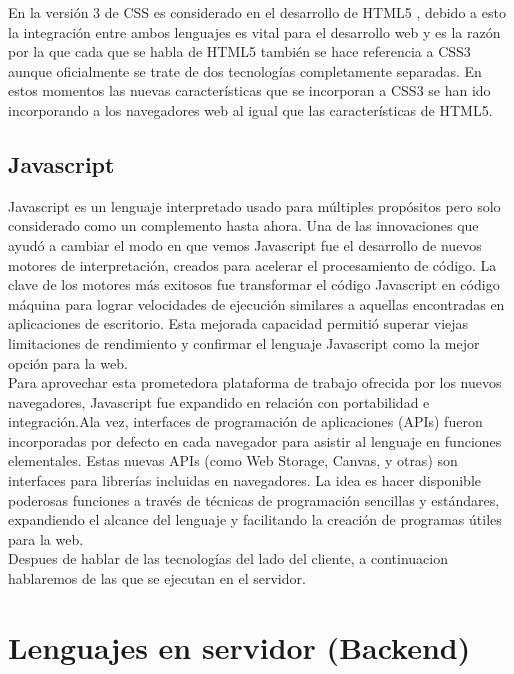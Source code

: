 En la versi\'on 3 de CSS es considerado en el desarrollo de HTML5 , debido a esto la integraci\'on entre ambos lenguajes es vital para el desarrollo web  y es la raz\'on por la que cada que se habla de HTML5 tambi\'en se hace referencia a CSS3 aunque oficialmente se trate de dos tecnolog\'ias completamente separadas.
En estos momentos las nuevas caracter\'isticas que se incorporan a CSS3 se han ido incorporando a los navegadores web al igual que las caracter\'isticas de HTML5.

\subsection{Javascript}

Javascript es un lenguaje interpretado usado para m\'ultiples prop\'ositos pero solo considerado como un complemento hasta ahora. Una de las innovaciones que ayud\'o a cambiar el modo en que vemos Javascript fue el desarrollo de nuevos motores de interpretaci\'on, creados para acelerar el procesamiento de c\'odigo. La clave de los motores m\'as exitosos fue transformar el c\'odigo Javascript en c\'odigo m\'aquina para lograr velocidades de ejecuci\'on similares a aquellas encontradas en aplicaciones de escritorio. Esta mejorada capacidad permiti\'o superar viejas limitaciones de rendimiento y confirmar el lenguaje Javascript como la mejor opci\'on para la web.\\

Para aprovechar esta prometedora plataforma de trabajo ofrecida por los nuevos navegadores, Javascript fue expandido en relaci\'on con portabilidad e integraci\'on.Ala vez, interfaces de programaci\'on de aplicaciones (APIs) fueron incorporadas por defecto en cada navegador para asistir al lenguaje en funciones elementales. Estas nuevas APIs (como Web Storage, Canvas, y otras) son interfaces para librer\'ias incluidas en navegadores. La idea es hacer disponible poderosas funciones a trav\'es de t\'ecnicas de programaci\'on sencillas y est\'andares, expandiendo el alcance del lenguaje y facilitando la creaci\'on de programas \'utiles para la web.\\


Despues de hablar de las tecnolog\'ias del lado del cliente, a continuacion hablaremos de las que se ejecutan en el servidor.

\section{Lenguajes en servidor (Backend)}
